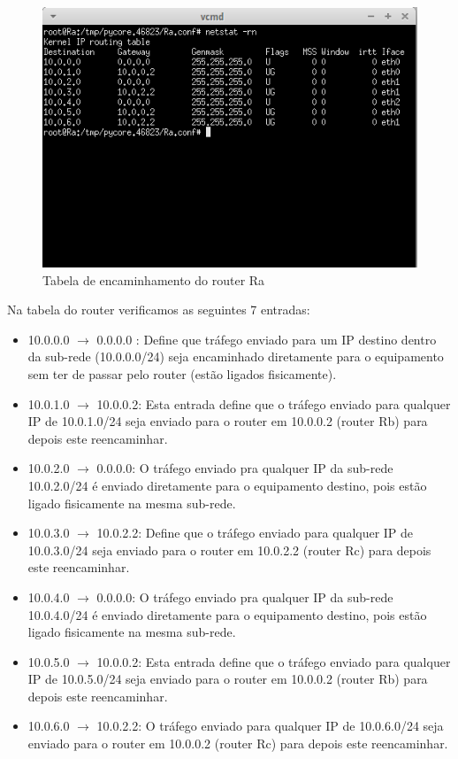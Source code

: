 \documentclass[a4paper]{article}
\begin{document}
\begin{figure}[!htb]
    \centering
    \includegraphics[scale=1]{parte2/tabela-routerA.png}\newline
    \caption{Tabela de encaminhamento do router Ra}
    \label{fig:my_label}
\end{figure}
Na tabela do router verificamos as seguintes 7 entradas:
\begin{itemize}
    \item 10.0.0.0 $\rightarrow$ 0.0.0.0 : Define que tráfego enviado para um IP destino dentro da sub-rede (10.0.0.0/24) seja encaminhado diretamente para o equipamento sem ter de passar pelo router (estão ligados fisicamente).
    \item 10.0.1.0 $\rightarrow$ 10.0.0.2: Esta entrada define que o tráfego enviado para qualquer IP de 10.0.1.0/24 seja enviado para o router em 10.0.0.2 (router Rb) para depois este reencaminhar.
    \item 10.0.2.0 $\rightarrow$ 0.0.0.0: O tráfego enviado pra qualquer IP da sub-rede 10.0.2.0/24 é enviado diretamente para o equipamento destino, pois estão ligado fisicamente na mesma sub-rede.
    \item 10.0.3.0 $\rightarrow$ 10.0.2.2: Define que o tráfego enviado para qualquer IP de 10.0.3.0/24 seja enviado para o router em 10.0.2.2 (router Rc) para depois este reencaminhar.
    \item 10.0.4.0 $\rightarrow$ 0.0.0.0: O tráfego enviado pra qualquer IP da sub-rede 10.0.4.0/24 é enviado diretamente para o equipamento destino, pois estão ligado fisicamente na mesma sub-rede.
    \item 10.0.5.0 $\rightarrow$ 10.0.0.2: Esta entrada define que o tráfego enviado para qualquer IP de 10.0.5.0/24 seja enviado para o router em 10.0.0.2 (router Rb) para depois este reencaminhar.
    \item 10.0.6.0 $\rightarrow$ 10.0.2.2: O tráfego enviado para qualquer IP de 10.0.6.0/24 seja enviado para o router em 10.0.0.2 (router Rc) para depois este reencaminhar.
\end{itemize}
\end{document}
